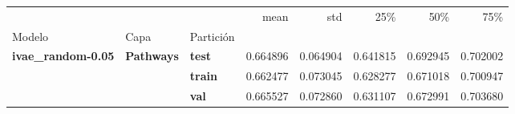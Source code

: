 \begin{tabular}{lllrrrrr}
\toprule
 &  &  & mean & std & 25\% & 50\% & 75\% \\
Modelo & Capa & Partición &  &  &  &  &  \\
\midrule
\multirow[t]{3}{*}{\textbf{ivae\_random-0.05}} & \multirow[t]{3}{*}{\textbf{Pathways}} & \textbf{test} & 0.664896 & 0.064904 & 0.641815 & 0.692945 & 0.702002 \\
\textbf{} & \textbf{} & \textbf{train} & 0.662477 & 0.073045 & 0.628277 & 0.671018 & 0.700947 \\
\textbf{} & \textbf{} & \textbf{val} & 0.665527 & 0.072860 & 0.631107 & 0.672991 & 0.703680 \\
\cline{1-8} \cline{2-8}
\bottomrule
\end{tabular}
